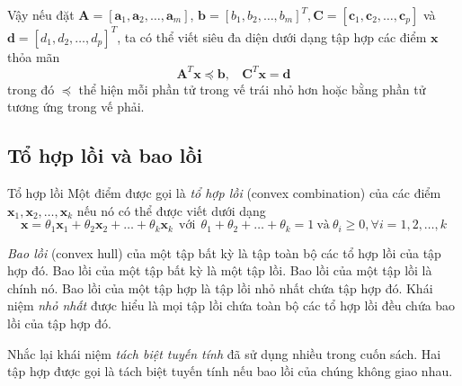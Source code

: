 Vậy nếu đặt $\mathbf{A} = [\mathbf{a}_1, \mathbf{a}_2, \dots, \mathbf{a}_m]$,
$\mathbf{b} = [b_1, b_2, \dots, b_m]^T, \mathbf{C} = [\mathbf{c}_1,
\mathbf{c}_2, \dots, \mathbf{c}_p]$ và $\mathbf{d} = [d_1, d_2, \dots, d_p]^T$, ta
có thể viết siêu đa diện dưới dạng tập hợp các điểm $\mathbf{x}$ thỏa mãn
\begin{equation*}
\mathbf{A}^T\mathbf{x} \preceq \mathbf{b}, ~~~~  \mathbf{C}^T\mathbf{x} = \mathbf{d}
\end{equation*}
trong đó $\preceq$ thể hiện mỗi phần tử trong vế trái nhỏ
hơn hoặc bằng phần tử tương ứng trong vế phải.


\subsection{Tổ hợp lồi và bao lồi}
\begin{mydef}{Tổ hợp lồi}{}
Một điểm được gọi là \textit{tổ hợp lồi} ({convex combination}) của các
điểm $\mathbf{x}_1, \mathbf{x}_2, \dots, \mathbf{x}_k$ nếu nó có thể được viết dưới dạng
\begin{equation*}
\mathbf{x} = \theta_1 \mathbf{x}_1 + \theta_2 \mathbf{x}_2 + \dots  +
\theta_k \mathbf{x}_k ~~ \text{với} ~~ \theta_1 + \theta_2 + \dots +
\theta_k = 1 ~\text{và}~ \theta_i \geq 0, \forall i= 1, 2, \dots, k
\end{equation*}
\end{mydef}

\textit{Bao lồi} ({{convex hull}}) của một {tập bất kỳ} là tập
toàn bộ các tổ hợp lồi của tập hợp đó.
Bao lồi của một tập bất kỳ là một tập lồi.
Bao lồi của một tập lồi là chính nó. Bao lồi của một tập hợp là tập lồi {nhỏ nhất} chứa tập
hợp đó. Khái niệm {\textit{nhỏ nhất}} được hiểu là mọi tập lồi chứa toàn bộ các tổ hợp lồi đều chứa bao lồi của tập hợp đó.


Nhắc lại khái niệm \textit{tách biệt tuyến tính} đã sử dụng nhiều trong cuốn
sách. Hai tập hợp được gọi là tách biệt tuyến tính nếu bao lồi của chúng không giao nhau.


